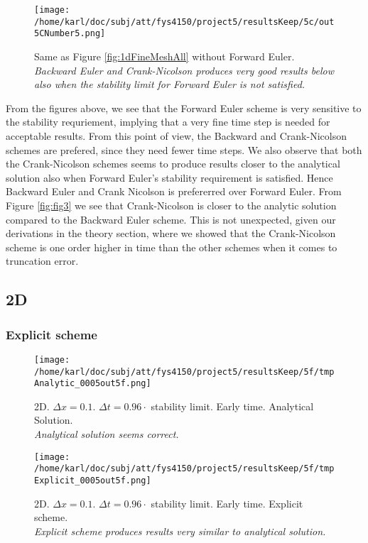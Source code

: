 \documentclass{article}
\begin{document}
\begin{figure}[H]
	\centering
	\texttt{[image: /home/karl/doc/subj/att/fys4150/project5/resultsKeep/5c/out5CNumber5.png]}
	\caption{Same as Figure \ref{fig:1dFineMeshAll} without Forward Euler. \\ \textit{Backward Euler and Crank-Nicolson produces very good results below also when the stability limit for Forward Euler is not satisfied.}}
	\label{1}
\end{figure}

From the figures above, we see that the Forward Euler scheme is very sensitive to the stability requriement, implying that a very fine time step is needed for acceptable results. From this point of view, the Backward and Crank-Nicolson schemes are prefered, since they need fewer time steps. We also observe that both the Crank-Nicolson schemes seems to produce results closer to the analytical solution also when Forward Euler's stability requirement is satisfied. Hence Backward Euler and Crank Nicolson is prefererred over Forward Euler. From Figure \ref{fig:fig3} we see that Crank-Nicolson is closer to the analytic solution compared to the Backward Euler scheme. This is not unexpected, given our derivations in the theory section, where we showed that the Crank-Nicolson scheme is one order higher in time than the other schemes when it comes to truncation error.

\subsection{2D}

\subsubsection{Explicit scheme}
\begin{minipage}{.45\textwidth} 
	\begin{figure}[H]
		\centering
		\texttt{[image: /home/karl/doc/subj/att/fys4150/project5/resultsKeep/5f/tmpAnalytic\_0005out5f.png]}
		\caption{2D. $\Delta x = 0.1$. $\Delta t = 0.96 \cdot$ stability limit. Early time. Analytical Solution.\\ \textit{Analytical solution seems correct.}}
		\label{fig:fig2d1}
	\end{figure}
\end{minipage}\hfill
\begin{minipage}{.45\textwidth} 
	\begin{figure}[H]
		\centering
		\texttt{[image: /home/karl/doc/subj/att/fys4150/project5/resultsKeep/5f/tmpExplicit\_0005out5f.png]}
		\caption{2D. $\Delta x = 0.1$. $\Delta t = 0.96 \cdot$ stability limit. Early time. Explicit scheme.\\ \textit{Explicit scheme produces results very similar to analytical solution.}}
		\label{fig:fig2d2}
	\end{figure}
\end{minipage}\hfill
\vspace{2ex}
\end{document}
